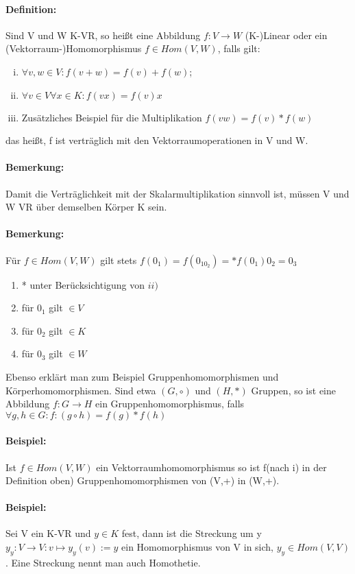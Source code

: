 \paragraph{Definition:}
	Sind V und W K-VR, so heißt eine Abbildung $f: V \rightarrow W$ (K-)Linear oder ein (Vektorraum-)Homomorphismus $f\in Hom(V,W)$, falls gilt:

\begin{enumerate}[(i)]
	\item $\forall v,w \in V: f(v+w) = f(v) + f(w)$;
	\item $\forall v\in V \forall x\in K: f(vx) = f(v)x$
	\item Zusätzliches Beispiel für die Multiplikation $f(vw) = f(v) * f(w)$
\end{enumerate}
    das heißt, f ist verträglich mit den Vektorraumoperationen in V und W.
\paragraph{Bemerkung:}
	Damit die Verträglichkeit mit der Skalarmultiplikation sinnvoll ist, müssen V und W VR über demselben Körper K sein.
\paragraph{Bemerkung:}
	Für $f\in Hom(V,W)$ gilt stets $f(0_1) = f(0_10_2) =* f(0_1)0_2 = 0_3$
	\begin{enumerate}
   	\item * unter Berücksichtigung von $ii)$
   	\item für $0_1$ gilt $\in V$
	\item für $0_2$ gilt $\in K$
	\item für $0_3$ gilt $\in W$
   \end{enumerate}
  
  Ebenso erklärt man zum Beispiel Gruppenhomomorphismen und Körperhomomorphismen. Sind etwa $(G,\circ)$ und $(H,*)$ Gruppen, so ist eine Abbildung $f: G \to H$ ein Gruppenhomomorphismus, falls $\forall g,h \in G: f:(g\circ h) = f(g) * f(h)$
\paragraph{Beispiel:}
	Ist $f\in Hom(V,W)$ ein Vektorraumhomomorphismus so ist f(nach i) in der Definition oben) Gruppenhomomorphismen von (V,+) in (W,+).
  
\paragraph{Beispiel:}
	Sei V ein K-VR und $y\in K$ fest, dann ist die Streckung um y $y_y:V\to V: v\mapsto y_y(v) := y$ ein Homomorphismus von V in sich, $y_y\in Hom(V,V)$. Eine Streckung nennt man auch Homothetie.
  	
